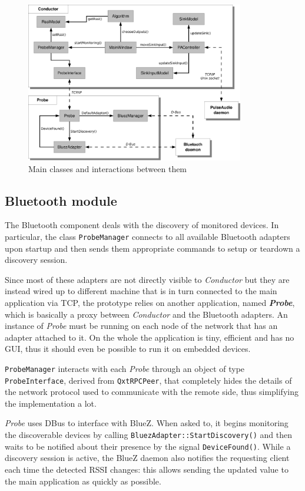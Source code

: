 \documentclass[conference]{IEEEtran}
\newcommand{\Conductor}{\textsl{Conductor}}
\newcommand{\Probe}{\textsl{Probe}}
\begin{document}
\begin{figure}
\centering
\includegraphics[width=0.85\textwidth]{Arch}
\caption{Main classes and interactions between them}
\label{arch}
\end{figure}

\subsection{Bluetooth module}
The Bluetooth component deals with the discovery of monitored devices. In particular, the class \texttt{ProbeManager} connects to all available Bluetooth adapters upon startup and then sends them appropriate commands to setup or teardown a discovery session.

Since most of these adapters are not directly visible to \Conductor{} but they are instead wired up to different machine that is in turn connected to the main application via TCP, the prototype relies on another application, named \textbf{\Probe{}}, which is basically a proxy between \Conductor{} and the Bluetooth adapters. An instance of \Probe{} must be running on each node of the network that has an adapter attached to it. On the whole the application is tiny, efficient and has no GUI, thus it should even be possible to run it on embedded devices.

\texttt{ProbeManager} interacts with each \Probe{} through an object of type \texttt{ProbeInterface}, derived from \texttt{QxtRPCPeer}, that completely hides the details of the network protocol used to communicate with the remote side, thus simplifying the implementation a lot.

\Probe{} uses DBus to interface with BlueZ. When asked to, it begins monitoring the discoverable devices by calling \texttt{BluezAdapter::StartDiscovery()} and then waits to be notified about their presence by the signal \texttt{DeviceFound()}. While a discovery session is active, the BlueZ daemon also notifies the requesting client each time the detected RSSI changes: this allows sending the updated value to the main application as quickly as possible.
\end{document}

